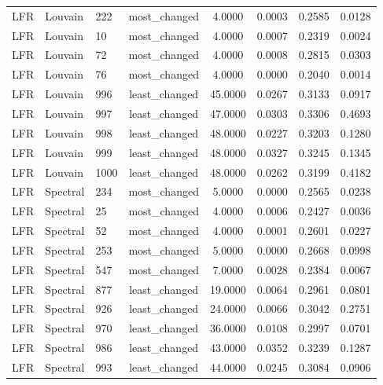 \begin{longtable}{lllccccc}
LFR & Louvain & 222 & most\_changed & 4.0000 & 0.0003 & 0.2585 & 0.0128 \\
LFR & Louvain & 10 & most\_changed & 4.0000 & 0.0007 & 0.2319 & 0.0024 \\
LFR & Louvain & 72 & most\_changed & 4.0000 & 0.0008 & 0.2815 & 0.0303 \\
LFR & Louvain & 76 & most\_changed & 4.0000 & 0.0000 & 0.2040 & 0.0014 \\
LFR & Louvain & 996 & least\_changed & 45.0000 & 0.0267 & 0.3133 & 0.0917 \\
LFR & Louvain & 997 & least\_changed & 47.0000 & 0.0303 & 0.3306 & 0.4693 \\
LFR & Louvain & 998 & least\_changed & 48.0000 & 0.0227 & 0.3203 & 0.1280 \\
LFR & Louvain & 999 & least\_changed & 48.0000 & 0.0327 & 0.3245 & 0.1345 \\
LFR & Louvain & 1000 & least\_changed & 48.0000 & 0.0262 & 0.3199 & 0.4182 \\
LFR & Spectral & 234 & most\_changed & 5.0000 & 0.0000 & 0.2565 & 0.0238 \\
LFR & Spectral & 25 & most\_changed & 4.0000 & 0.0006 & 0.2427 & 0.0036 \\
LFR & Spectral & 52 & most\_changed & 4.0000 & 0.0001 & 0.2601 & 0.0227 \\
LFR & Spectral & 253 & most\_changed & 5.0000 & 0.0000 & 0.2668 & 0.0998 \\
LFR & Spectral & 547 & most\_changed & 7.0000 & 0.0028 & 0.2384 & 0.0067 \\
LFR & Spectral & 877 & least\_changed & 19.0000 & 0.0064 & 0.2961 & 0.0801 \\
LFR & Spectral & 926 & least\_changed & 24.0000 & 0.0066 & 0.3042 & 0.2751 \\
LFR & Spectral & 970 & least\_changed & 36.0000 & 0.0108 & 0.2997 & 0.0701 \\
LFR & Spectral & 986 & least\_changed & 43.0000 & 0.0352 & 0.3239 & 0.1287 \\
LFR & Spectral & 993 & least\_changed & 44.0000 & 0.0245 & 0.3084 & 0.0906 \\
\end{longtable}